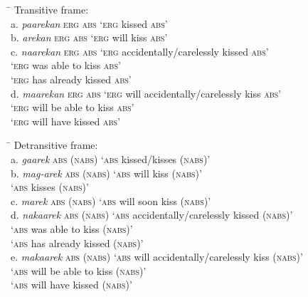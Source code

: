 \ea
\label{bkm:Ref148532212}
\begin{tabbing}
\hspace{4.5cm} \= \kill
Transitive frame: \\
a.  \textit{paarekan} \textsc{erg} \textsc{abs} \>  ‘\textsc{erg} kissed \textsc{abs}’ \\
b.  \textit{arekan} \textsc{erg} \textsc{abs} \> ‘\textsc{erg} will kiss \textsc{abs}’ \\
c.  \textit{naarekan} \textsc{erg} \textsc{abs} \>  ‘\textsc{erg} accidentally/carelessly kissed \textsc{abs}’ \\
\>      ‘\textsc{erg} was able to kiss \textsc{abs}’ \\
\>      ‘\textsc{erg} has already kissed \textsc{abs}’ \\
d.  \textit{maarekan} \textsc{erg} \textsc{abs} \>  ‘\textsc{erg} will accidentally/carelessly kiss \textsc{abs}’ \\
\>      ‘\textsc{erg} will be able to kiss \textsc{abs}’ \\
\>      ‘\textsc{erg} will have kissed \textsc{abs}’
\end{tabbing}
\z
\ea
\label{bkm:Ref148532215}
\begin{tabbing}
\hspace{4.5cm} \= \kill
Detransitive frame: \\
a.  \textit{gaarek} \textsc{abs} (\textsc{nabs}) \> ‘\textsc{abs} kissed/kisses (\textsc{nabs})’ \\
b.  \textit{mag{}-arek} \textsc{abs} (\textsc{nabs}) \> ‘\textsc{abs} will kiss (\textsc{nabs})’ \\
\>      ‘\textsc{abs} kisses (\textsc{nabs})’ \\
c.  \textit{marek} \textsc{abs} (\textsc{nabs}) \> ‘\textsc{abs} will soon kiss (\textsc{nabs})’ \\
d.  \textit{nakaarek} \textsc{abs} (\textsc{nabs}) \> ‘\textsc{abs} accidentally/carelessly kissed (\textsc{nabs})’ \\
\>      ‘\textsc{abs} was able to kiss (\textsc{nabs})’ \\
\>      ‘\textsc{abs} has already kissed (\textsc{nabs})’ \\
e.  \textit{makaarek} \textsc{abs} (\textsc{nabs}) \> ‘\textsc{abs} will accidentally/carelessly kiss (\textsc{nabs})’ \\
\>      ‘\textsc{abs} will be able to kiss (\textsc{nabs})’ \\
\>      ‘\textsc{abs} will have kissed (\textsc{nabs})’ \\
\end{tabbing}
\z

